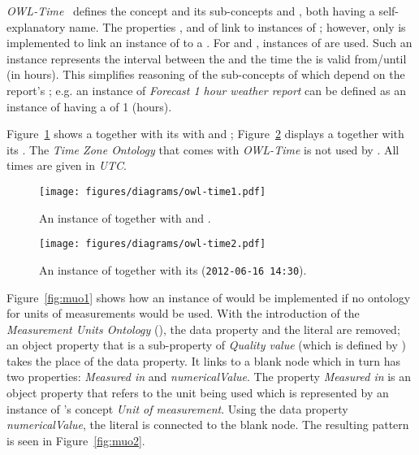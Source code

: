 \vspace{1em}

\emph{OWL-Time}~\cite{owl-time} defines the concept  and its sub-concepts  and , both having a self-explanatory name. The properties ,  and  of  link to instances of ; however, only  is implemented to link an instance of  to a . For  and , instances of  are used. Such an instance represents the interval between the  and the time the  is valid from/until (in hours). This simplifies reasoning of the sub-concepts of  which depend on the report's ; e.g. an instance of \emph{Forecast 1 hour weather report} can be defined as an instance of  having a  of \num{1} (hours).

Figure~\ref{fig:owl_time1} shows a  together with its with  and ; Figure~\ref{fig:owl_time2} displays a  together with its . The \emph{Time Zone Ontology} that comes with \emph{OWL-Time} is not used by \smarthomeweather. All times are given in \emph{UTC}.

\begin{figure}
  \centering
  \texttt{[image: figures/diagrams/owl-time1.pdf]}
  \caption[An instance of ]{An instance of  together with  and .}
  \label{fig:owl_time1}
\end{figure}

\begin{figure}
  \centering
  \texttt{[image: figures/diagrams/owl-time2.pdf]}
  \caption[A instance of ]{An instance of  together with its  (\texttt{2012-06-16~14:30}).}
  \label{fig:owl_time2}
\end{figure}

\vspace{1em}

Figure~\ref{fig:muo1} shows how an instance of  would be implemented if no ontology for units of measurements would be used. With the introduction of the \emph{Measurement Units Ontology} (\muo), the data property and the literal are removed; an object property that is a sub-property of \emph{Quality value} (which is defined by \muo) takes the place of the data property. It links to a blank node which in turn has two properties: \emph{Measured in} and \emph{numericalValue}. The property \emph{Measured in} is an object property that refers to the unit being used which is represented by an instance of \muo's concept \emph{Unit of measurement}. Using the data property \emph{numericalValue}, the literal is connected to the blank node. The resulting pattern is seen in Figure~\ref{fig:muo2}.

